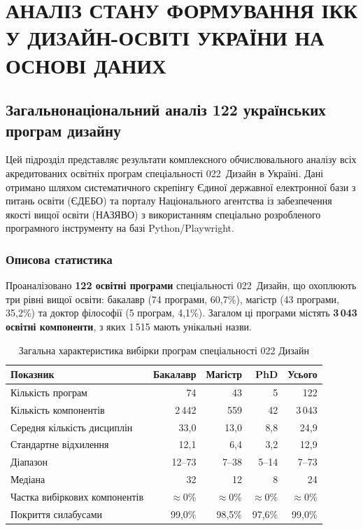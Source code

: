 \section{АНАЛІЗ СТАНУ ФОРМУВАННЯ ІКК У ДИЗАЙН-ОСВІТІ УКРАЇНИ НА ОСНОВІ ДАНИХ}\label{sec:2}

\subsection{Загальнонаціональний аналіз 122 українських програм дизайну}\label{subsec:2.1}

Цей підрозділ представляє результати комплексного обчислювального аналізу всіх акредитованих освітніх програм спеціальності 022~Дизайн в Україні. Дані отримано шляхом систематичного скрепінгу Єдиної державної електронної бази з питань освіти (ЄДЕБО) та порталу Національного агентства із забезпечення якості вищої освіти (НАЗЯВО) з використанням спеціально розробленого програмного інструменту на базі Python/Playwright.

\subsubsection{Описова статистика}\label{sssec:2.1.1}

Проаналізовано \textbf{122 освітні програми} спеціальності 022~Дизайн, що охоплюють три рівні вищої освіти: бакалавр (74 програми, 60,7\%), магістр (43 програми, 35,2\%) та доктор філософії (5 програм, 4,1\%). Загалом ці програми містять \textbf{3\,043 освітні компоненти}, з яких 1\,515 мають унікальні назви.

\begin{table}[htbp]
\centering
\caption{Загальна характеристика вибірки програм спеціальності 022 Дизайн}\label{tab:naqa-descriptive}
\small
\begin{tabularx}{\textwidth}{@{}Xrrrr@{}}
\toprule
\textbf{Показник} & \textbf{Бакалавр} & \textbf{Магістр} & \textbf{PhD} & \textbf{Усього} \\
\midrule
Кількість програм & 74 & 43 & 5 & 122 \\
Кількість компонентів & 2\,442 & 559 & 42 & 3\,043 \\
Середня кількість дисциплін & 33,0 & 13,0 & 8,8 & 24,9 \\
Стандартне відхилення & 12,1 & 6,4 & 3,2 & 12,9 \\
Діапазон & 12--73 & 7--38 & 5--14 & 7--73 \\
Медіана & 32 & 12 & 8 & 24 \\
Частка вибіркових компонентів & $\approx$0\% & $\approx$0\% & $\approx$0\% & $\approx$0\% \\
Покриття силабусами & 99,0\% & 98,5\% & 97,6\% & 99,0\% \\
\bottomrule
\end{tabularx}
\end{table}

